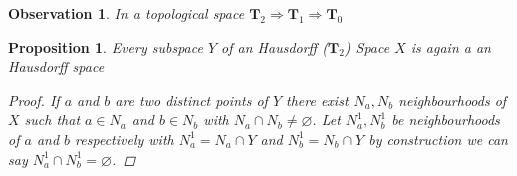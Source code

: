 \documentclass{article}
\newtheorem{proposition}{Proposition}
\newtheorem{obs}{Observation}
\begin{document}
            \begin{obs}
                In a topological space $\mathbf{T}_2 \Rightarrow \mathbf{T}_1 \Rightarrow \mathbf{T}_0$
            \end{obs}
            \begin{proposition}
                Every subspace $Y$ of an Hausdorff ($\mathbf{T}_2$) Space $X$ is again a an Hausdorff space
                \begin{proof}
                    If $a$ and $b$ are two distinct points of $Y$ there exist $N_a, N_b$ neighbourhoods of $X$ such that $a \in N_a$ and $b \in N_b$ with $N_a \cap N_b \neq \varnothing$.
                    Let $N_a^1, N_b^1$ be neighbourhoods of $a$ and $b$ respectively with $N_a^1 = N_a \cap Y$ and $N_b^1 = N_b \cap Y$ by construction we can say $N_a^1 \cap N_b^1 = \varnothing$.
                 \end{proof}
            \end{proposition}
        \newpage
\end{document}
